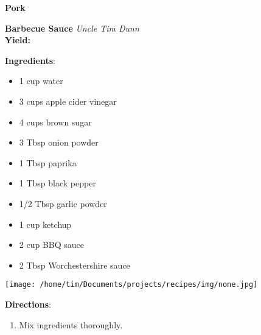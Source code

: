 \documentclass[11pt, twoside, openany]{book}
\begin{document}
{\newpage \LARGE \textbf{Pork}} \label{pork}\\
\noindent\begin{minipage}[t]{\linewidth}%
{\Large\textbf{Barbecue Sauce}} \label{barbecue-sauce}\hfill\textit{Uncle Tim Dunn}\\
\textbf{Yield:} \textit{}\\
\noindent\begin{minipage}[t]{0.78\linewidth}%
\textbf{Ingredients}:\vspace{-3mm}
\begin{multicols}{2}
\begin{itemize}\setlength\itemsep{-1mm}
\item 1 cup water
\item 3 cups apple cider vinegar
\item 4 cups brown sugar
\item 3 Tbsp onion powder
\item 1 Tbsp paprika
\item 1 Tbsp black pepper
\item 1/2 Tbsp garlic powder
\item 1 cup ketchup
\item 2 cup BBQ sauce
\item 2 Tbsp Worchestershire sauce
\end{itemize}
\end{multicols}
\end{minipage}
\noindent\begin{minipage}[t]{0.18\linewidth}
\centering \strut\vspace*{-\baselineskip}\newline
\texttt{[image: /home/tim/Documents/projects/recipes/img/none.jpg]}\\
\end{minipage}\vspace{3mm}
\textbf{Directions}:
\vspace{-3mm}\begin{enumerate}\setlength\itemsep{-1mm}
\item Mix ingredients thoroughly.
\end{enumerate}
\end{minipage}\vspace{8mm}
\end{document}
